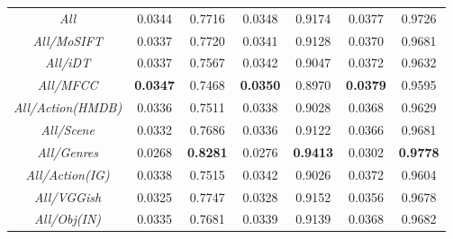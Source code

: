 \documentclass[review]{elsarticle}
\def\boxit#1{\smash{\fboxsep=0pt\llap{\rlap{\fbox{\strut\makebox[#1]{}}}~}}\ignorespaces
}
\begin{document}
\begin{table}[H]
\begin{adjustbox}{width=\columnwidth}
\begin{tabular}{|c|c c c c c c|}
\textit{All} 	&0.0344	&0.7716	&0.0348	&0.9174	&0.0377	&0.9726	\\ 
\textit{All/MoSIFT} 	&0.0337	&0.7720	&0.0341	&0.9128	&0.0370	&0.9681	\\ 
\textit{All/iDT} 	&0.0337	&0.7567	&0.0342	&0.9047	&0.0372	&0.9632	\\ 
\boxit{5.8in} \textit{All/MFCC}	&\textbf{0.0347}	&0.7468	&\textbf{0.0350}	&0.8970	&\textbf{0.0379}	&0.9595 \\ 
\textit{All/Action(HMDB)}	&0.0336	&0.7511	&0.0338	&0.9028	&0.0368	&0.9629	\\ 
\textit{All/Scene}  	&0.0332	&0.7686	&0.0336	&0.9122	&0.0366	&0.9681	\\ 
\textit{All/Genres} 	&0.0268	&\textbf{0.8281}	&0.0276	&\textbf{0.9413}	&0.0302	&\textbf{0.9778}	\\ 
\textit{All/Action(IG)} 	&0.0338	&0.7515	&0.0342	&0.9026	&0.0372	&0.9604	\\ 
\textit{All/VGGish}	&0.0325	&0.7747	&0.0328	&0.9152	&0.0356	&0.9678	\\ 
\textit{All/Obj(IN)} 	&0.0335	&0.7681	&0.0339	&0.9139	&0.0368	&0.9682	\\ \hline
    \end{tabular}
    \end{adjustbox}
\end{table}
\end{document}

